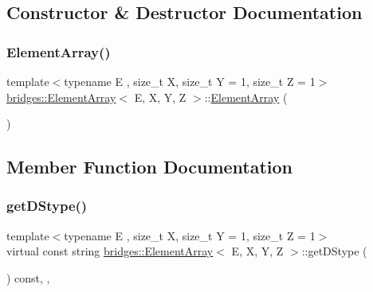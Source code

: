 \subsection{Constructor \& Destructor Documentation}
\hypertarget{classbridges_1_1_element_array_aef0cfb2b7b35cd5b368e4c3987e41768}{}\label{classbridges_1_1_element_array_aef0cfb2b7b35cd5b368e4c3987e41768} 
\subsubsection{\texorpdfstring{Element\+Array()}{ElementArray()}}
{\footnotesize\ttfamily template$<$typename E , size\+\_\+t X, size\+\_\+t Y = 1, size\+\_\+t Z = 1$>$ \\
\hyperlink{classbridges_1_1_element_array}{bridges\+::\+Element\+Array}$<$ E, X, Y, Z $>$\+::\hyperlink{classbridges_1_1_element_array}{Element\+Array} (\begin{DoxyParamCaption}{ }\end{DoxyParamCaption})\hspace{0.3cm}{\ttfamily [inline]}}



\subsection{Member Function Documentation}
\hypertarget{classbridges_1_1_element_array_adfb4e7d78ce01298ca66447e5c5abe6f}{}\label{classbridges_1_1_element_array_adfb4e7d78ce01298ca66447e5c5abe6f} 
\subsubsection{\texorpdfstring{get\+D\+Stype()}{getDStype()}}
{\footnotesize\ttfamily template$<$typename E , size\+\_\+t X, size\+\_\+t Y = 1, size\+\_\+t Z = 1$>$ \\
virtual const string \hyperlink{classbridges_1_1_element_array}{bridges\+::\+Element\+Array}$<$ E, X, Y, Z $>$\+::get\+D\+Stype (\begin{DoxyParamCaption}{ }\end{DoxyParamCaption}) const\hspace{0.3cm}{\ttfamily [inline]}, {\ttfamily [override]}, {\ttfamily [virtual]}}

